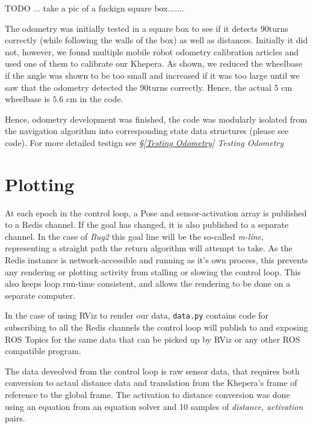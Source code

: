 \documentclass[11pt, a4paper]{article}
\begin{document}
TODO ... take a pic of a fuckign square box.......

The odometry was initially tested in a square box to see if it detects $90$\degree turns correctly 
(while following the walls of the box) as well as distances. Initially it did not, however, we 
found multiple mobile robot odometry calibration articles and used one of them\cite{odo_calibration}
 to calibrate our Khepera. As shown, we reduced the wheelbase if the angle was shown to be too small 
and increased if it was too large until we saw that the odometry detected the  $90$\degree turns correctly. 
Hence, the actual $5$ cm wheelbase is $5.6$ cm in the code.

Hence, odometry development was finished, the code was modularly isolated from the navigation algorithm 
into corresponding state data structures (please see code). For more detailed testign see 
\textit{\S\ref{Testing Odometry} Testing Odometry}



\newpage
\section{Plotting}
\label{Plotting}

At each epoch in the control loop, a Pose and sensor-activation array is published to a Redis channel.
If the goal has changed, it is also published to a separate channel. 
In the case of \textit{Bug2} this goal line will be the so-called \textit{m-line}, representing a 
straight path the return algorithm will attempt to take. As the Redis instance is network-accessible 
and running as it's own process, this prevents any rendering or plotting activity from stalling or 
slowing the control loop. This also keeps loop run-time consistent, and allows the rendering to
be done on a separate computer.

In the case of using RViz to render our data, \texttt{data.py} contains code for 
subscribing to all the Redis channels the control loop will publish to and exposing 
ROS Topics for the same data that can be picked up by RViz or any other ROS compatible 
program.

The data deveolved from the control loop is raw sensor data, that requires both conversion to
actaul distance data and translation from the Khepera's frame of reference to the global frame.
The activation to distance conversion was done using an equation from an equation solver and 10
samples of \textit{distance, activation} pairs.
\end{document}
